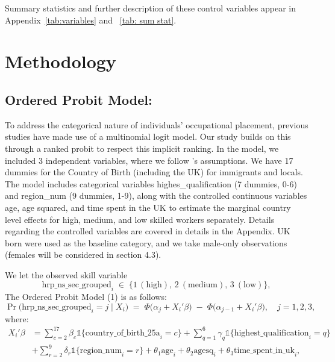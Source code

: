\documentclass[12pt, a4paper]{article}
\begin{document}
Summary statistics and further description of these control variables appear in Appendix~\ref{tab:variables} and ~\ref{tab: sum stat}.

\section{Methodology}  

\subsection{Ordered Probit Model:}\label{probit}
To address the categorical nature of individuals’ occupational placement, previous studies have made use of a multinomial logit model. Our study builds on this through a ranked probit to respect this implicit ranking. In the model, we included 3 independent variables, where we follow \citet{MattooBrainWaste}'s assumptions. We have 17 dummies for the Country of Birth (including the UK) for immigrants and locals. The model includes categorical variables highes\_qualification (7 dummies, 0-6) and region\_num (9 dummies, 1-9), along with the controlled continuous variables age, age squared, and time spent in the UK to estimate the marginal country level effects for high, medium, and low skilled workers separately. Details regarding the controlled variables are covered in details in the Appendix. UK born were used as the baseline category, and we take male-only observations (females will be considered in section 4.3). 

We let the observed skill variable 
\[
  \text{hrp\_ns\_sec\_grouped}_i \;\in\;\{1\, (\text{high}),\,2\ (\text{medium}),\,3\ (\text{low})\},
\]
The Ordered Probit Model (1) is as follows:
\[
  \Pr\bigl(\text{hrp\_ns\_sec\_grouped}_i = j \mid X_i \bigr)
  \;=\;\Phi\bigl(\alpha_j + X_i'\beta\bigr)
  \;-\;\Phi\bigl(\alpha_{j-1} + X_i'\beta\bigr),
  \quad j=1,2,3,
\]
where:
\begin{equation}\label{eq:probit}
\begin{align*}
X_i' \beta &= \sum_{c=2}^{17} \beta_{c} \mathbb{1}\{\mathrm{country\_of\_birth\_25a}_i = c\} 
           + \sum_{q=1}^{6} \gamma_{q} \mathbb{1}\{\mathrm{highest\_qualification}_i = q\} \\
           &+ \sum_{r=2}^{9} \delta_{r} \mathbb{1}\{\mathrm{region\_num}_i = r\} 
           + \theta_1 \text{age}_i 
           + \theta_2 \text{agesq}_i 
           + \theta_3 \text{time\_spent\_in\_uk}_i,
\end{align*}
\end{equation}
\end{document}
